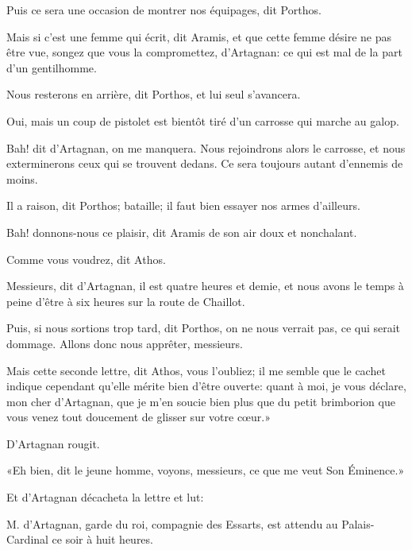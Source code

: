 \speak  Puis ce sera une occasion de montrer nos équipages, dit Porthos. 

\speak  Mais si c'est une femme qui écrit, dit Aramis, et que cette femme désire ne pas être vue, songez que vous la compromettez, d'Artagnan: ce qui est mal de la part d'un gentilhomme. 

\speak  Nous resterons en arrière, dit Porthos, et lui seul s'avancera. 

\speak  Oui, mais un coup de pistolet est bientôt tiré d'un carrosse qui marche au galop. 

\speak  Bah! dit d'Artagnan, on me manquera. Nous rejoindrons alors le carrosse, et nous exterminerons ceux qui se trouvent dedans. Ce sera toujours autant d'ennemis de moins. 

\speak  Il a raison, dit Porthos; bataille; il faut bien essayer nos armes d'ailleurs. 

\speak  Bah! donnons-nous ce plaisir, dit Aramis de son air doux et nonchalant. 

\speak  Comme vous voudrez, dit Athos. 

\speak  Messieurs, dit d'Artagnan, il est quatre heures et demie, et nous avons le temps à peine d'être à six heures sur la route de Chaillot. 

\speak  Puis, si nous sortions trop tard, dit Porthos, on ne nous verrait pas, ce qui serait dommage. Allons donc nous apprêter, messieurs. 

\speak  Mais cette seconde lettre, dit Athos, vous l'oubliez; il me semble que le cachet indique cependant qu'elle mérite bien d'être ouverte: quant à moi, je vous déclare, mon cher d'Artagnan, que je m'en soucie bien plus que du petit brimborion que vous venez tout doucement de glisser sur votre cœur.» 

D'Artagnan rougit. 

«Eh bien, dit le jeune homme, voyons, messieurs, ce que me veut Son Éminence.» 

Et d'Artagnan décacheta la lettre et lut:

\begin{a4}
\vspace{-0.5cm}
\end{a4}

\begin{mail}{}{}
M. d'Artagnan, garde du roi, compagnie des Essarts, est attendu au Palais-Cardinal ce soir à huit heures. 
\end{mail}

